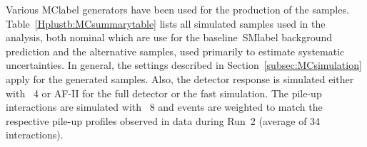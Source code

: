 Various \acrshort{MClabel} generators have been used for the production of the samples. Table~\ref{Hplustb:MCsummarytable} lists all simulated samples used in the analysis, both nominal which are use for the baseline~\acrshort{SMlabel} background prediction and the alternative samples, used primarily to estimate systematic uncertainties. In general, the settings described in Section~\ref{subsec:MCsimulation} apply for the generated samples. Also, the detector response is simulated either with \GEANT~4 or AF-II for the full detector or the fast simulation. The pile-up interactions are simulated with \PYTHIA~8 and events are weighted to match the respective pile-up profiles observed in data during Run~2 (average of 34 interactions).%

